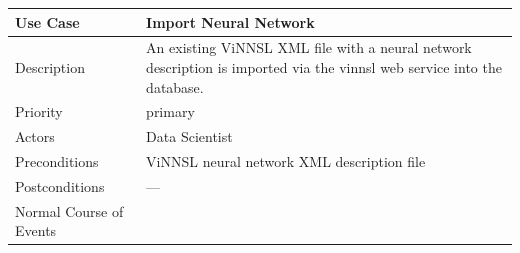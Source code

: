\begin{longtable}[]{@{}ll@{}}
\toprule
\begin{minipage}[b]{0.27\columnwidth}\raggedright\strut
\textbf{Use Case}\strut
\end{minipage} & \begin{minipage}[b]{0.68\columnwidth}\raggedright\strut
\textbf{Import Neural Network}\strut
\end{minipage}\tabularnewline
\midrule
\endhead
\begin{minipage}[t]{0.27\columnwidth}\raggedright\strut
Description\strut
\end{minipage} & \begin{minipage}[t]{0.68\columnwidth}\raggedright\strut
An existing ViNNSL XML file with a neural network description is
imported via the vinnsl web service into the database.\strut
\end{minipage}\tabularnewline
\begin{minipage}[t]{0.27\columnwidth}\raggedright\strut
Priority\strut
\end{minipage} & \begin{minipage}[t]{0.68\columnwidth}\raggedright\strut
primary\strut
\end{minipage}\tabularnewline
\begin{minipage}[t]{0.27\columnwidth}\raggedright\strut
Actors\strut
\end{minipage} & \begin{minipage}[t]{0.68\columnwidth}\raggedright\strut
Data Scientist\strut
\end{minipage}\tabularnewline
\begin{minipage}[t]{0.27\columnwidth}\raggedright\strut
Preconditions\strut
\end{minipage} & \begin{minipage}[t]{0.68\columnwidth}\raggedright\strut
ViNNSL neural network XML description file\strut
\end{minipage}\tabularnewline
\begin{minipage}[t]{0.27\columnwidth}\raggedright\strut
Postconditions\strut
\end{minipage} & \begin{minipage}[t]{0.68\columnwidth}\raggedright\strut
---\strut
\end{minipage}\tabularnewline
\begin{minipage}[t]{0.27\columnwidth}\raggedright\strut
Normal Course of Events\strut
\end{minipage} & \begin{minipage}[t]{0.68\columnwidth}\raggedright\strut

\end{minipage}
\end{longtable}
